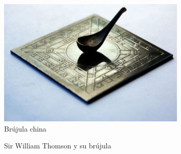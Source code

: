 \begin{figure}[h!btp]
\centering
\includegraphics[scale=0.5, fbox={\fboxrule} 4mm]{images/03-antecedentes/53-chinese_compass.jpg}
\caption{Brújula china}
\label{fig:chinese_compass}
\end{figure}

\begin{figure}[h!btp]
	\begin{adjustbox}{minipage=\linewidth, fbox}
		\centering
		\hspace{10mm}
	\end{adjustbox}
	\caption{Sir William Thomson y su brújula}
	\label{fig:william_thomson}
\end{figure}



